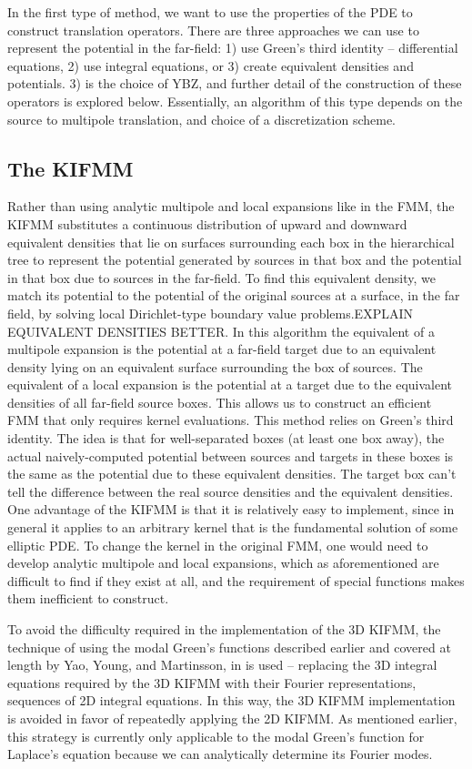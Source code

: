 \documentclass[11pt, oneside]{article}   	%
\begin{document}
In the first type of method, we want to use the properties of the PDE to construct translation operators. There are three approaches we can use to represent the potential in the far-field: 1) use Green's third identity -- differential equations, 2) use integral equations, or 3) create equivalent densities and potentials. 3) is the choice of YBZ, and further detail of the construction of these operators is explored below. Essentially, an algorithm of this type depends on the source to multipole translation, and choice of a discretization scheme.

\subsection{The KIFMM}
Rather than using analytic multipole and local expansions like in the FMM, the KIFMM substitutes a continuous distribution of upward and downward equivalent densities that lie on surfaces surrounding each box in the hierarchical tree to represent the potential generated by sources in that box and the potential in that box due to sources in the far-field. To find this equivalent density, we match its potential to the potential of the original sources at a surface, in the far field, by solving local Dirichlet-type boundary value problems.EXPLAIN EQUIVALENT DENSITIES BETTER. In this algorithm the equivalent of a multipole expansion is the potential at a far-field target due to an equivalent density lying on an equivalent surface surrounding the box of sources. The equivalent of a local expansion is the potential at a target due to the equivalent densities of all far-field source boxes. This allows us to construct an efficient FMM that only requires kernel evaluations. This method relies on Green's third identity. The idea is that for well-separated boxes (at least one box away), the actual naively-computed potential between sources and targets in these boxes is the same as the potential due to these equivalent densities. The target box can't tell the difference between the real source densities and the equivalent densities. One advantage of the KIFMM is that it is relatively easy to implement, since in general it applies to an arbitrary kernel that is the fundamental solution of some elliptic PDE. To change the kernel in the original FMM, one would need to develop analytic multipole and local expansions, which as aforementioned are difficult to find if they exist at all, and the requirement of special functions makes them inefficient to construct.

To avoid the difficulty required in the implementation of the 3D KIFMM, the technique of using the modal Green's functions described earlier and covered at length by Yao, Young, and Martinsson, in \cite{YYM} is used -- replacing the 3D integral equations required by the 3D KIFMM with their Fourier representations, sequences of 2D integral equations. In this way, the 3D KIFMM implementation is avoided in favor of repeatedly applying the 2D KIFMM. As mentioned earlier, this strategy is currently only applicable to the modal Green's function for Laplace's equation because we can analytically determine its Fourier modes.
\end{document}
